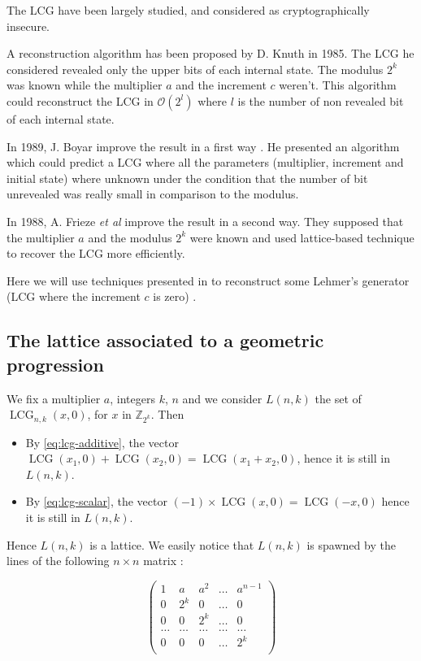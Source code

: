\documentclass[submission,svgnames,journal=tosc]{iacrtrans}
\DeclareMathOperator{\LCG}{LCG}
\begin{document}
The LCG have been largely studied, and considered as cryptographically insecure. 

A reconstruction algorithm has been proposed by D. Knuth in 1985\cite{Knuth85}. The LCG he considered revealed only the upper bits of each internal state. The modulus \(2^k\) was known while the multiplier \(a\) and the increment \(c\) weren't. This algorithm could reconstruct the LCG in \(\mathcal{O}(2^l)\) where \(l\) is the number of non revealed bit of each internal state.

In 1989, J. Boyar improve the result in a first way \cite{Boyar1989}. He presented an algorithm which could predict a LCG where all the parameters (multiplier, increment and initial state) where unknown under the condition that the number of bit unrevealed was really small in comparison to the modulus.

In 1988, A. Frieze \textit{et al} \cite{Frieze} improve the result in a second way. They supposed that the multiplier \(a\) and the modulus \(2^k\) were known and used lattice-based technique to recover the LCG more efficiently.

Here we will use techniques presented in \cite{Frieze} to reconstruct some Lehmer's generator (LCG where the increment \(c\) is zero) \cite{Lehmer}.

\subsection{The lattice associated to a geometric progression}\label{lattice}

We fix a multiplier \(a\), integers \(k\), \(n\) and we consider \(L(n,k)\) the set of \(\LCG_{n,k}(x, 0)\), for \(x\) in \(\mathbb{Z}_{2^k}\). Then

\begin{itemize}
	\item By \eqref{eq:lcg-additive}, the vector \(\LCG(x_1,0) + \LCG(x_2,0) = \LCG(x_1+x_2,0)\), hence it is still in \(L(n,k)\).
	\item By \eqref{eq:lcg-scalar}, the vector \((-1)\times \LCG(x,0) = \LCG(-x,0)\) hence it is still in \(L(n,k)\).
\end{itemize}

Hence \(L(n,k)\) is a lattice. We easily notice that \(L(n,k)\) is spawned by the lines of the following \(n\times n\) matrix :

\[
  \begin{pmatrix}
    1 & a   & a^2 & \dots & a^{n-1} \\
    0 & 2^k & 0   & \dots & 0 \\
    0 & 0   & 2^k & \dots & 0 \\
    \dots & \dots & \dots & \dots & \dots\\
    0 & 0 & 0 & \dots & 2^k \\
  \end{pmatrix}
\]
\end{document}

